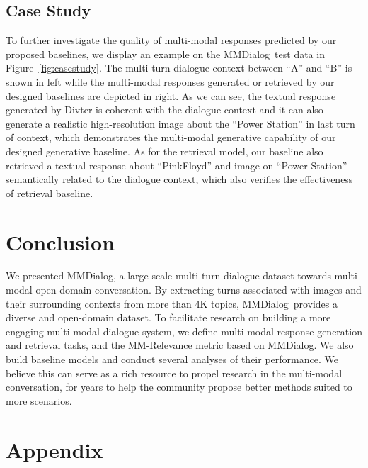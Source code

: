 \documentclass[11pt]{article}
\newcommand{\DataName}{MMDialog}
\begin{document}
\subsection{Case Study}
To further investigate the quality of multi-modal responses predicted by our proposed baselines, we display an example on the \DataName~test data in Figure~\ref{fig:casestudy}. The multi-turn dialogue context between ``A'' and ``B'' is shown in left while the multi-modal responses generated or retrieved by our designed baselines are depicted in right. As we can see, the textual response generated by Divter is coherent with the dialogue context and it can also generate a realistic high-resolution image about the ``Power Station'' in last turn of context, which demonstrates the multi-modal generative capability of our designed generative baseline. As for the retrieval model, our baseline also retrieved a textual response about ``PinkFloyd'' and image on ``Power Station'' semantically related to the dialogue context, which also verifies the effectiveness of retrieval baseline.







 \section{Conclusion}
We presented \DataName, a large-scale multi-turn dialogue dataset towards multi-modal open-domain conversation. By extracting turns associated with images and their surrounding contexts from more than 4K topics, \DataName~provides a diverse and open-domain dataset. To facilitate research on building a more engaging multi-modal dialogue system, we define multi-modal response generation and retrieval tasks, and the MM-Relevance metric based on \DataName. We also build baseline models and conduct several analyses of their performance. We believe this can serve as a rich resource to propel research in the multi-modal conversation, for years to help the community propose better methods suited to more scenarios.




 

\clearpage
  

\clearpage


\appendix

\section{Appendix}\label{sec:appendix}
\end{document}
